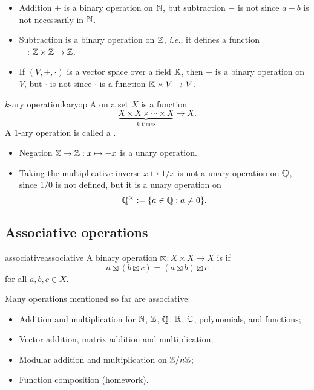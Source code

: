 \documentclass[12pt,letterpaper]{report}
\begin{document}
\begin{ex}
  \begin{itemize}
    \item
    Addition $+$ is a binary operation on $\mathbb{N}$, but subtraction $-$ is not since $a - b$ is
    not necessarily in $\mathbb{N}$.
    \item
    Subtraction is a binary operation on $\mathbb{Z}$, \emph{i.e.}, it defines a function
    $- \colon \mathbb{Z} \times \mathbb{Z} \to \mathbb{Z}$.
    \item
    If $(V, +, \cdot)$ is a vector space over a field $\mathbb{K}$, then $+$ is a binary operation
    on $V$, but $\cdot$ is not since $\cdot$ is a function $\mathbb{K} \times V \to V$.
  \end{itemize}
\end{ex}

\begin{defn}{$k$-ary operation}{karyop}
  A  on a set $X$ is a function
  \[
    \underbrace{X \times X \times \cdots \times X}_{k \text{ times}} \to X.
  \]
  A $1$-ary operation is called a .
\end{defn}

\begin{ex}
  \begin{itemize}
    \item
    Negation $\mathbb{Z} \to \mathbb{Z} : x \mapsto -x$ is a unary operation.
    \item
    Taking the multiplicative inverse $x \mapsto 1/x$ is not a unary operation on $\mathbb{Q}$,
    since $1/0$ is not defined, but it is a unary operation on
    \[ \mathbb{Q}^\times := \{ a \in \mathbb{Q} : a \neq 0 \}. \]
  \end{itemize}
\end{ex}

\pagebreak
\subsection{Associative operations}

\begin{defn}{associative}{associative}
  A binary operation $\boxtimes \colon X \times X \to X$ is  if
  \[
    a \boxtimes (b \boxtimes c) = (a \boxtimes b) \boxtimes c
  \]
  for all $a, b, c \in X$.
\end{defn}

Many operations mentioned so far are associative:
\begin{itemize}
  \item
  Addition and multiplication for $\mathbb{N}$, $\mathbb{Z}$, $\mathbb{Q}$, $\mathbb{R}$,
  $\mathbb{C}$, polynomials, and functions;
  \item
  Vector addition, matrix addition and multiplication;
  \item
  Modular addition and multiplication on $\mathbb{Z}/{n}\mathbb{Z}$;
  \item
  Function composition (homework).
\end{itemize}
\end{document}
